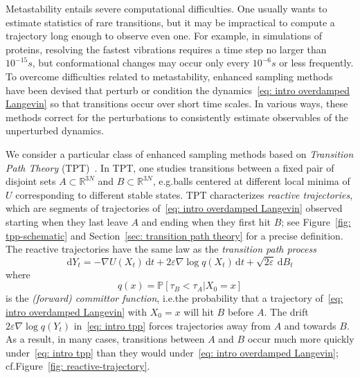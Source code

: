 \documentclass[reqno]{amsart}
\newcommand{\Real}{\mathbb{R}}
\newcommand{\eps}{\varepsilon}
\newcommand{\1}{\mathds{1}}
\renewcommand{\d}{\mathrm{d}}
\newcommand{\grad}{\nabla}
\renewcommand{\P}{\mathds{P}}
\theoremstyle{definition}
\theoremstyle{remark}
\begin{document}
Metastability entails severe computational difficulties. One usually wants to estimate statistics of rare transitions, but it may be impractical to compute a trajectory long enough to observe even one. For example, in simulations of proteins, resolving the fastest vibrations requires a time step no larger than $10^{-15} s$, but conformational changes may occur only every $10^{-6} s$ or less frequently. To overcome difficulties related to metastability, enhanced sampling methods have been devised that perturb or condition the dynamics~\eqref{eq: intro overdamped Langevin} so that transitions occur over short time scales. In various ways, these methods correct for the perturbations to consistently estimate observables of the unperturbed dynamics.

We consider a particular class of enhanced sampling methods based on \emph{Transition Path Theory} (TPT)~\cite{e_towards_2006,lu_reactive_2015}. In TPT, one studies transitions between a fixed pair of disjoint sets $A \subset \Real^{3N}$ and $B \subset \Real^{3N}$, e.g.\@ balls centered at different local minima of $U$ corresponding to different stable states. TPT characterizes \emph{reactive trajectories}, which are segments of trajectories of~\eqref{eq: intro overdamped Langevin} observed starting when they last leave $A$ and ending when they first hit $B$; see Figure~\ref{fig: tpp-schematic} and Section~\ref{sec: transition path theory} for a precise definition. The reactive trajectories have the same law as the \emph{transition path process}
\begin{equation}\label{eq: intro tpp}
  \d Y_t = - \grad U (X_t) \, \d t + 2 \eps \grad \log q(X_t) \, \d t + \sqrt{2 \eps} \,  \d B_t 
\end{equation}
where
\begin{equation*}
  q(x) = \P [\tau_B < \tau_A \vert X_0=x]
\end{equation*}
is the \emph{(forward) committor function}, i.e.\@ the probability that a trajectory of~\eqref{eq: intro overdamped Langevin} with $X_0=x$ will hit $B$ before $A$.
The drift $2 \eps \grad \log q(Y_t)$ in~\eqref{eq: intro tpp} forces trajectories away from $A$ and towards $B$. As a result, in many cases, transitions between $A$ and $B$ occur much more quickly under~\eqref{eq: intro tpp} than they would under~\eqref{eq: intro overdamped Langevin}; cf.\@ Figure~\ref{fig: reactive-trajectory}.
\end{document}
